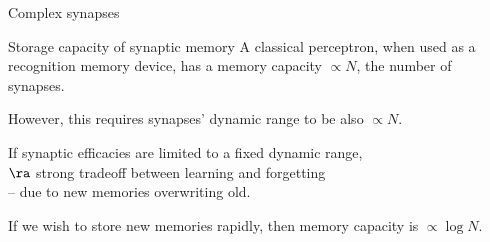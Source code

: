 \documentclass[final,hyperref={pdfpagelabels=false,bookmarks=false}]{beamer}
\begin{document}
\begin{frame}{}
\begin{columns}[t]
\begin{column}{0.33\linewidth}
\begin{block}{Complex synapses}
\begin{minipage}[t]{0.45\linewidth}
   \vspace{1cm}
   \begin{center}
   \hspace{2cm}
   \end{center}
 \end{minipage}
%
\end{block}


\begin{block}{Storage capacity of synaptic memory}
%
 A classical perceptron, when used as a recognition memory device, has a memory capacity $\propto N$, the number of synapses.

 \parbox[t]{0.58\linewidth}{
 \vp However, this requires synapses' dynamic range to be also $\propto N$.

 \vp If synaptic efficacies are limited to a fixed dynamic range,\\
 $\ra$ strong tradeoff between learning and forgetting \\
 -- due to new memories overwriting old.

 \vp If we wish to store new memories rapidly, then memory capacity is $\propto \log N$.

 }
 \parbox[t]{0.4\linewidth}{
   \begin{flushright}
   \end{flushright}
 }


\end{block}
\end{column}
\end{columns}
\end{frame}
\end{document}
